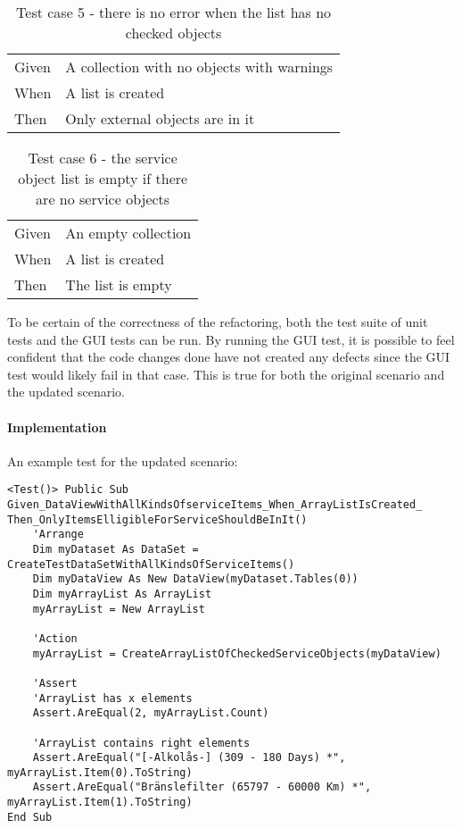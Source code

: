 \documentclass{article}
\begin{document}
				\begin{table}[h!]
					\centering
					\begin{tabular}{|p{1cm} p{7cm} |}
					\hline
					Given 	& A collection with no objects with warnings\\ 
					When 	& A list is created  \\	
					Then 	& Only external objects are in it \\
					\hline
					\end{tabular}
					\caption{Test case 5 - there is no error when the list has no checked objects}
				\end{table}


				\begin{table}[h!]
					\centering
					\begin{tabular}{|p{1cm} p{7cm} |}
					\hline
					Given 	& An empty collection \\ 
					When 	& A list is created  \\	
					Then 	& The list is empty \\
					\hline
					\end{tabular}
					\caption{Test case 6 - the service object list is empty if there are no service objects}
				\end{table}

				To be certain of the correctness of the refactoring, both the test suite of unit tests and the GUI tests can be run. By running the GUI test, it is possible to feel confident that the code changes done have not created any defects since the GUI test would likely fail in that case. This is true for both the original scenario and the updated scenario.

				\paragraph{Implementation}
				An example test for the updated scenario:

				\begin{lstlisting}
<Test()> Public Sub Given_DataViewWithAllKindsOfserviceItems_When_ArrayListIsCreated_
Then_OnlyItemsElligibleForServiceShouldBeInIt()
	'Arrange
	Dim myDataset As DataSet = CreateTestDataSetWithAllKindsOfServiceItems()
	Dim myDataView As New DataView(myDataset.Tables(0))
	Dim myArrayList As ArrayList
	myArrayList = New ArrayList

	'Action
	myArrayList = CreateArrayListOfCheckedServiceObjects(myDataView)

	'Assert
	'ArrayList has x elements
	Assert.AreEqual(2, myArrayList.Count)

	'ArrayList contains right elements
	Assert.AreEqual("[-Alkolås-] (309 - 180 Days) *", myArrayList.Item(0).ToString)
	Assert.AreEqual("Bränslefilter (65797 - 60000 Km) *", myArrayList.Item(1).ToString)
End Sub
				\end{lstlisting}
\end{document}
